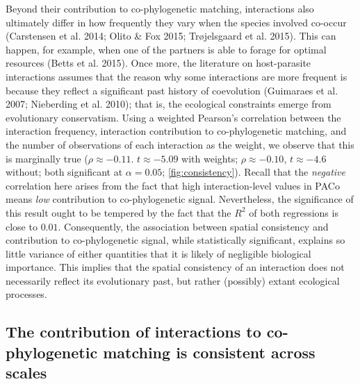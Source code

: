 \documentclass[11pt,serif]{article}
\begin{document}
Beyond their contribution to co-phylogenetic matching, interactions also
ultimately differ in how frequently they vary when the species involved
co-occur (Carstensen et al. 2014; Olito \& Fox 2015; Trøjelsgaard et al.
2015). This can happen, for example, when one of the partners is able to
forage for optimal resources (Betts et al. 2015). Once more, the
literature on host-parasite interactions assumes that the reason why
some interactions are more frequent is because they reflect a
significant past history of coevolution (Guimaraes et al. 2007;
Nieberding et al. 2010); that is, the ecological constraints emerge from
evolutionary conservatism. Using a weighted Pearson's correlation
between the interaction frequency, interaction contribution to
co-phylogenetic matching, and the number of observations of each
interaction as the weight, we observe that this is marginally true
(\(\rho \approx -0.11\). \(t \approx -5.09\) with weights;
\(\rho \approx -0.10\), \(t \approx -4.6\) without; both significant at
\(\alpha = 0.05\); \cref{fig:consistency}). Recall that
the \emph{negative} correlation here arises from the fact that high
interaction-level values in PACo means \emph{low} contribution to
co-phylogenetic signal. Nevertheless, the significance of this result
ought to be tempered by the fact that the \(R^2\) of both regressions is
close to \(0.01\). Consequently, the association between spatial
consistency and contribution to co-phylogenetic signal, while
statistically significant, explains so little variance of either
quantities that it is likely of negligible biological importance. This
implies that the spatial consistency of an interaction does not
necessarily reflect its evolutionary past, but rather (possibly) extant
ecological processes.

\subsection{The contribution of interactions to co-phylogenetic matching
is consistent across
scales}\label{the-contribution-of-interactions-to-co-phylogenetic-matching-is-consistent-across-scales}
\end{document}
